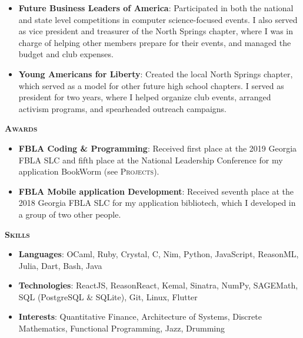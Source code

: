 \documentclass{article}
\begin{document}
  \vspace{3pt}

  \begin{itemize}
    \item \textbf{Future Business Leaders of America}: Participated in both the national and state level competitions in computer science-focused events. I also served as vice president and treasurer of the North Springs chapter, where I was in charge of helping other members prepare for their events, and managed the budget and club expenses.
    \item \textbf{Young Americans for Liberty}: Created the local North Springs chapter, which served as a model for other future high school chapters. I served as president for two years, where I helped organize club events, arranged activism programs, and spearheaded outreach campaigns.
  \end{itemize}

  \vspace{10pt}

  {\large \textbf{\textsc{Awards}}}\hspace{5pt}\xrfill[.5ex]{.4pt}

  \vspace{3pt}

  \begin{itemize}
    \item \textbf{FBLA Coding \& Programming}: Received first place at the 2019 Georgia FBLA SLC and fifth place at the National Leadership Conference for my application BookWorm (see \textsc{Projects}).
    \item \textbf{FBLA Mobile application Development}: Received seventh place at the 2018 Georgia FBLA SLC for my application bibliotech, which I developed in a group of two other people.
  \end{itemize}

  \vspace{10pt}

  {\large \textbf{\textsc{Skills}}}\hspace{5pt}\xrfill[.5ex]{.4pt}

  \vspace{3pt}

  \begin{itemize}
    \item \textbf{Languages}: OCaml, Ruby, Crystal, C, Nim, Python, JavaScript, ReasonML, Julia, Dart, Bash, Java
    \item \textbf{Technologies}: ReactJS, ReasonReact, Kemal, Sinatra, NumPy, SAGEMath, SQL (PostgreSQL \& SQLite), Git, Linux, Flutter
    \item \textbf{Interests}: Quantitative Finance, Architecture of Systems, Discrete Mathematics, Functional Programming, Jazz, Drumming
  \end{itemize}
\end{document}
